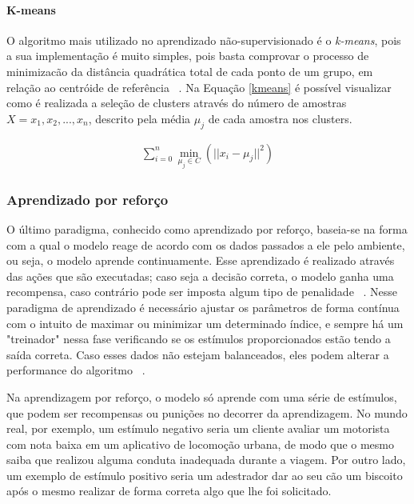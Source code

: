 
          \paragraph{K-means}
          O algoritmo mais utilizado no aprendizado não-supervisionado é o \textit{k-means}, pois a sua implementação é muito simples, pois basta comprovar
          o processo de minimizacão da distância quadrática total de cada ponto de um grupo, em relação ao centróide de referência ~\cite{macqueen1967some}. Na 
          Equação \ref{kmeans} é possível visualizar como é realizada a seleção de clusters através do número de amostras $X = {x_1,x_2,...,x_n} $, descrito pela média $\mu_{j}$ de 
          cada amostra nos clusters. 

          \begin{equation}\label{kmeans}
            \begin{aligned}
              \sum_{i=0}^{n}\min_{\mu_j \in C}(||x_i - \mu_j||^2)
          \end{aligned} 
          \end{equation}



    \subsubsection{Aprendizado por reforço}

          O último paradigma, conhecido como aprendizado por reforço, baseia-se na forma com a qual o modelo reage de acordo com os dados passados a ele pelo ambiente, ou seja, o modelo aprende continuamente. 
          Esse aprendizado é realizado através das ações que são executadas; caso seja a decisão correta, o modelo ganha uma recompensa, caso
          contrário pode ser imposta algum tipo de penalidade ~\cite{zurada}. Nesse paradigma de aprendizado é necessário ajustar os parâmetros de forma
          contínua com o intuito de maximar ou minimizar um determinado índice, e sempre há um "treinador" nessa fase verificando se os estímulos proporcionados
          estão tendo a saída correta. Caso esses dados não estejam balanceados, eles podem alterar a performance do algoritmo ~\cite{mazurowski2008training}.


          Na aprendizagem por reforço, o modelo só aprende com uma série de estímulos, que podem ser recompensas ou punições no decorrer da aprendizagem. No mundo real, por exemplo, um estímulo negativo seria um cliente avaliar um motorista com nota baixa em um aplicativo de locomoção urbana, de modo que o mesmo saiba que realizou alguma conduta inadequada durante a viagem. Por outro lado, um exemplo de estímulo positivo seria um adestrador dar ao seu cão um biscoito após o mesmo realizar de forma correta algo que lhe foi solicitado.

